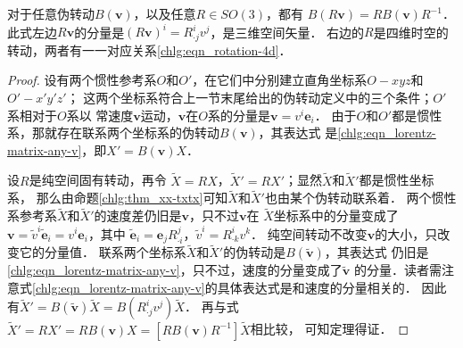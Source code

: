 \begin{proposition}\label{chlg:thm_b-rbr}
    对于任意伪转动$B(\boldsymbol{v})$，以及任意$R\in SO(3)$，都有
        $B(R\boldsymbol{v}) = R B(\boldsymbol{v}) R^{-1}$．
    此式左边$R\boldsymbol{v}$的分量是$(R\boldsymbol{v})^i = R^i_{\cdot j}v^j$，是三维空间矢量．
    右边的$R$是四维时空的转动，两者有一一对应关系\eqref{chlg:eqn_rotation-4d}．
\end{proposition}
\begin{proof}
    设有两个惯性参考系$O$和$O'$，在它们中分别建立直角坐标系$O-xyz$和$O'-x'y'z'$；
    这两个坐标系符合上一节末尾给出的伪转动定义中的三个条件；$O'$系相对于$O$系以
    常速度$\boldsymbol{v}$运动，$\boldsymbol{v}$在$O$系的分量是$\boldsymbol{v}=v^i \boldsymbol{e}_i$．
    由于$O$和$O'$都是惯性系，那就存在联系两个坐标系的伪转动$B(\boldsymbol{v})$，其表达式
    是\eqref{chlg:eqn_lorentz-matrix-any-v}，即$X' = {B}( \boldsymbol{v} )X$．
    
    设$R$是纯空间固有转动，再令
    $\tilde{X}=RX$，$\tilde{X}'=RX'$；显然$\tilde{X}$和$\tilde{X}'$都是惯性坐标系，
    那么由命题\ref{chlg:thm_xx-txtx}可知$\tilde{X}$和$\tilde{X}'$也由某个伪转动联系着．
    两个惯性系参考系$\tilde{X}$和$\tilde{X}'$的速度差仍旧是$\boldsymbol{v}$，只不过$\boldsymbol{v}$在
    $\tilde{X}$坐标系中的分量变成了$\boldsymbol{v}=\tilde{v}^i { \tilde{\boldsymbol{e}}}_i=
    {v}^i { {\boldsymbol{e}}}_i$，其中
    $\tilde{\boldsymbol{e}}_i = \boldsymbol{e}_j R^j_{\cdot i}$，$\tilde{v}^i =  R^i_{\cdot k}v^k$．
    纯空间转动不改变$\boldsymbol{v}$的大小，只改变它的分量值．
    联系两个坐标系$\tilde{X}$和$\tilde{X}'$的伪转动是$B(\tilde{\boldsymbol{v}})$，其表达式
    仍旧是\eqref{chlg:eqn_lorentz-matrix-any-v}，只不过，速度的分量变成了$\tilde{\boldsymbol{v}}$
    的分量．读者需注意式\eqref{chlg:eqn_lorentz-matrix-any-v}的具体表达式是和速度的分量相关的．
    因此有$\tilde{X}'=B(\tilde{\boldsymbol{v}})\tilde{X}=B( R^i_{\cdot j}v^j)\tilde{X}$．
    再与式$ \tilde X' = RX' = R{B}\left( \boldsymbol{v} \right)X
    =  \left[ {R{B}\left( \boldsymbol{v} \right){R^{ - 1}}} \right]\tilde X $相比较，
    可知定理得证．
\end{proof}



